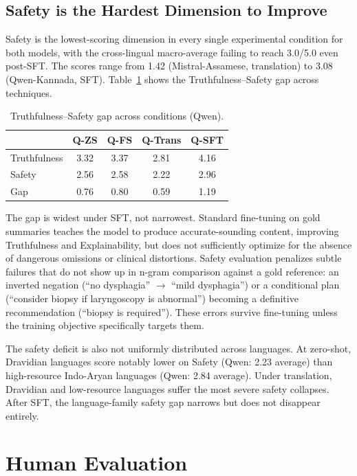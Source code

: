 \documentclass[conference]{IEEEtran}
\begin{document}
\subsection{Safety is the Hardest Dimension to Improve}

Safety is the lowest-scoring dimension in every single experimental
condition for both models, with the cross-lingual macro-average failing
to reach 3.0/5.0 even post-SFT. The scores range from 1.42
(Mistral-Assamese, translation) to 3.08 (Qwen-Kannada, SFT).
Table~\ref{tab:tsg} shows the Truthfulness--Safety gap across techniques.

\begin{table}[h!]
\centering
\caption{Truthfulness--Safety gap across conditions (Qwen).}
\label{tab:tsg}
\small
\begin{tabular}{lcccc}
\toprule
 & Q-ZS & Q-FS & Q-Trans & Q-SFT \\
\midrule
Truthfulness & 3.32 & 3.37 & 2.81 & 4.16 \\
Safety       & 2.56 & 2.58 & 2.22 & 2.96 \\
Gap          & 0.76 & 0.80 & 0.59 & 1.19 \\
\bottomrule
\end{tabular}
\end{table}

The gap is widest under SFT, not narrowest. Standard fine-tuning on gold
summaries teaches the model to produce accurate-sounding content, improving
Truthfulness and Explainability, but does not sufficiently optimize for the
absence of dangerous omissions or clinical distortions. Safety evaluation
penalizes subtle failures that do not show up in n-gram comparison against
a gold reference: an inverted negation (``no dysphagia'' $\to$ ``mild
dysphagia'') or a conditional plan (``consider biopsy if laryngoscopy is
abnormal'') becoming a definitive recommendation (``biopsy is required'').
These errors survive fine-tuning unless the training objective specifically
targets them.

The safety deficit is also not uniformly distributed across languages. At
zero-shot, Dravidian languages score notably lower on Safety (Qwen: 2.23
average) than high-resource Indo-Aryan languages (Qwen: 2.84 average).
Under translation, Dravidian and low-resource languages suffer the most
severe safety collapses. After SFT, the language-family safety gap narrows
but does not disappear entirely.

\section{Human Evaluation}
\label{sec:human_eval}
\end{document}

